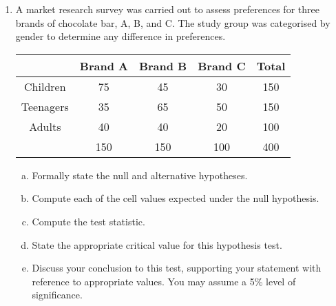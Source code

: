 \documentclass[a4paper,12pt]{article}
\begin{document}
\begin{enumerate}
\item A market research survey was carried out to assess preferences for three brands of chocolate bar, A, B, and C. 
The study group was categorised by gender to determine any difference in preferences.


{
	\begin{center}
		\begin{tabular}{|c||c|c|c||c|} \hline
			&	Brand A	&	Brand B	&	Brand C	&	Total	\\ \hline		\hline
			Children	&	75	&	45	&	30	&	150	\\ \hline	
			Teenagers	&	35	&	65	&	50	&	150	\\ \hline	
			Adults	&	40	&	40	&	20	&	100	\\ \hline	\hline
			&	150	&	150	&	100	&	400	\\ \hline	 
		\end{tabular} 
	\end{center}
}
\begin{enumerate}[(a)]
	\item  Formally state the null and alternative hypotheses.
	\item  Compute each of the cell values expected under the null hypothesis. 
	\item  Compute the test statistic.
	\item  State the appropriate critical value for this hypothesis test.
	\item  Discuss your conclusion to this test, supporting your statement with reference to appropriate values. You may assume a 5\% level of significance.
\end{enumerate}

\smallskip

\end{enumerate}
\end{document}
